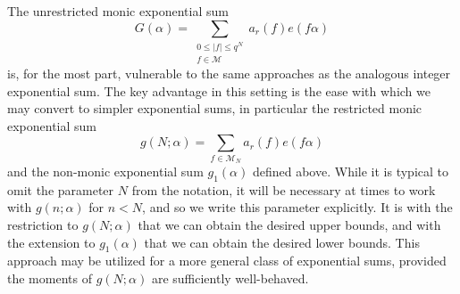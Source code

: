 \documentclass[reqno,11pt]{amsart}
\theoremstyle{definition}
\theoremstyle{remark}
\numberwithin{equation}{section}
\def\calM{{\mathcal M}}
\newcommand{\<}{\begin{equation}}
\renewcommand{\>}{\end{equation}}
\begin{document}
The unrestricted monic exponential sum
\[G(\alpha) = \sum_{\substack{0 \leq |f| \leq q^N \\ f \in \calM}} a_r(f)e(f\alpha)\]
is, for the most part, vulnerable to the same approaches as the analogous integer exponential sum. The key advantage in this setting is the ease with which we may convert to simpler exponential sums, in particular the restricted monic exponential sum
\[g(N;\alpha) = \sum_{f \in \calM_N} a_r(f)e(f\alpha)\]
and the non-monic exponential sum $g_1(\alpha)$ defined above. While it is typical to omit the parameter $N$ from the notation, it will be necessary at times to work with $g(n;\alpha)$ for $n<N$, and so we write this parameter explicitly. It is with 
the restriction to $g(N;\alpha)$ that we can obtain the desired upper bounds, and with the extension to $g_1(\alpha)$ that we can obtain the desired lower bounds. This approach may be utilized for a more general class of exponential sums, provided the moments of $g(N;\alpha)$ are sufficiently well-behaved. 
\end{document}
